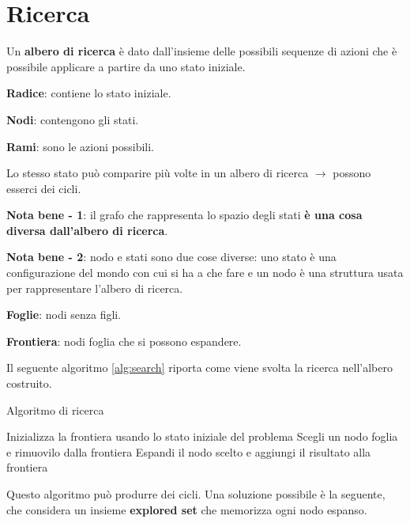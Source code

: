 \newpage

\section{Ricerca}

Un \textbf{albero di ricerca} è dato dall'insieme delle possibili sequenze di
azioni che è possibile applicare a partire da uno stato iniziale.

\textbf{Radice}: contiene lo stato iniziale.

\textbf{Nodi}: contengono gli stati.

\textbf{Rami}: sono le azioni possibili.

Lo stesso stato può comparire più volte in un albero di ricerca $\rightarrow$
possono esserci dei cicli.

\textbf{Nota bene - 1}: il grafo che rappresenta lo spazio degli stati \textbf{è una
cosa diversa dall'albero di ricerca}.

\textbf{Nota bene - 2}: nodo e stati sono due cose diverse: uno stato è una
configurazione del mondo con cui si ha a che fare e un nodo è una struttura
usata per rappresentare l'albero di ricerca.

\textbf{Foglie}: nodi senza figli.

\textbf{Frontiera}: nodi foglia che si possono espandere.

Il seguente algoritmo \ref{alg:search} riporta come viene svolta la ricerca nell'albero
costruito. 

\begin{algorithm}
    \caption{Algoritmo di ricerca}
    \label{alg:search}
    \begin{algorithmic}[1] %
         
			\State Inizializza la frontiera usando lo stato iniziale del problema
            \Loop
              \EndIf
            \State Scegli un nodo foglia e rimuovilo dalla frontiera
              \EndIf
            \State Espandi il nodo scelto e aggiungi il risultato alla frontiera
			\EndLoop
        \EndProcedure
    \end{algorithmic}
\end{algorithm}

Questo algoritmo può produrre dei cicli. Una soluzione possibile è la seguente,
che considera un insieme \textbf{explored set} che memorizza ogni nodo espanso.


